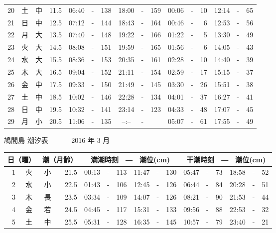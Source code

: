 \documentclass[12pt.a4j]{jsarticle}
\begin{document}
\begin{center}
\begin{table}[ht]
\begin{tabular}{|rc|cr|ccrccr|ccrccr|}
20 & 土 & 中 & 11.5 &  06:40 &-& 138  &  18:00 &-& 159  &   00:06 &-&  10  &   12:14 &-&  65  \\
21 & 日 & 中 & 12.5 &  07:12 &-& 144  &  18:43 &-& 164  &   00:46 &-&   6  &   12:53 &-&  56  \\
22 & 月 & 大 & 13.5 &  07:40 &-& 148  &  19:22 &-& 166  &   01:22 &-&   5  &   13:30 &-&  49  \\
23 & 火 & 大 & 14.5 &  08:08 &-& 151  &  19:59 &-& 165  &   01:56 &-&   6  &   14:05 &-&  43  \\
24 & 水 & 大 & 15.5 &  08:36 &-& 153  &  20:35 &-& 161  &   02:28 &-&  10  &   14:40 &-&  39  \\
25 & 木 & 大 & 16.5 &  09:04 &-& 152  &  21:11 &-& 154  &   02:59 &-&  17  &   15:15 &-&  37  \\
26 & 金 & 中 & 17.5 &  09:33 &-& 150  &  21:49 &-& 145  &   03:30 &-&  26  &   15:51 &-&  38  \\
27 & 土 & 中 & 18.5 &  10:02 &-& 146  &  22:28 &-& 134  &   04:01 &-&  37  &   16:27 &-&  41  \\
28 & 日 & 中 & 19.5 &  10:32 &-& 141  &  23:14 &-& 123  &   04:33 &-&  48  &   17:07 &-&  45  \\
29 & 月 & 小 & 20.5 &  11:06 &-& 135  &  --:-- &-&     &   05:07 &-&  61  &   17:55 &-&  49  \\
   \hline
   \end{tabular}
\end{table}
\newpage
 {\LARGE 鳩間島  潮汐表　　　}
 {\large 2016 年  3 月}\\
 \begin{table}[ht]
    \begin{tabular}{|rc|cr|ccrccr|ccrccr|}
    \hline
    \multicolumn{2}{|c|}{日（曜）} & \multicolumn{2}{c|}{潮（月齢）} & \multicolumn{6}{c|}{満潮時刻　―　潮位(cm)} & \multicolumn{6}{c|}{干潮時刻　―　潮位(cm)} \\
 \hline
 1 & 火 & 小 & 21.5 &  00:13 &-& 113  &  11:47 &-& 130  &   05:47 &-&  73  &   18:58 &-&  52  \\
 2 & 水 & 小 & 22.5 &  01:43 &-& 106  &  12:45 &-& 126  &   06:44 &-&  84  &   20:28 &-&  51  \\
 3 & 木 & 長 & 23.5 &  03:34 &-& 109  &  14:07 &-& 126  &   08:21 &-&  90  &   21:53 &-&  44  \\
 4 & 金 & 若 & 24.5 &  04:45 &-& 117  &  15:31 &-& 133  &   09:56 &-&  88  &   22:53 &-&  32  \\
 5 & 土 & 中 & 25.5 &  05:31 &-& 128  &  16:35 &-& 145  &   10:57 &-&  79  &   23:40 &-&  21  \\

\end{tabular}
\end{table}
\end{center}
\end{document}
